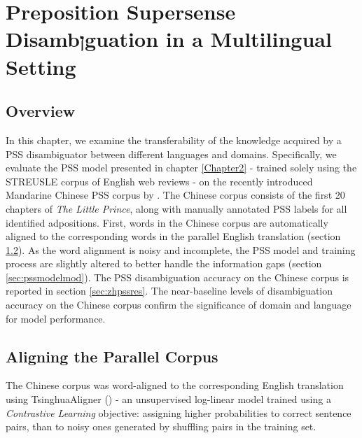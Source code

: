 
\chapter{Preposition Supersense Disambןguation in a Multilingual Setting } %

\label{Chapter4} %

\section{Overview}

In this chapter, we examine the transferability of the knowledge acquired by a PSS disambiguator between different languages and domains. Specifically, we evaluate the PSS model presented in chapter \ref{Chapter2} - trained solely using the STREUSLE corpus of English web reviews - on the recently introduced Mandarine Chinese PSS corpus by \cite{chinesecorpus}. The Chinese corpus consists of the first 20 chapters of \textit{The Little Prince}, along with manually annotated PSS labels for all identified adpositions. First, words in the Chinese corpus are automatically aligned to the corresponding words in the parallel English translation (section \ref{sec:chinesecorpus}). As the word alignment is noisy and incomplete, the PSS model and training process are slightly altered to better handle the information gaps (section \ref{sec:pssmodelmod}). The PSS disambiguation accuracy on the Chinese corpus is reported in section \ref{sec:zhpssres}. The near-baseline levels of disambiguation accuracy on the Chinese corpus confirm the significance of domain and language for model performance.

\section{Aligning the Parallel Corpus} \label{sec:chinesecorpus}

The Chinese corpus was word-aligned to the corresponding English translation using TsinghuaAligner (\cite{liu2014contrastive}) - an unsupervised log-linear model trained using a \textit{Contrastive Learning} objective: assigning higher probabilities to correct sentence pairs, than to noisy ones generated by shuffling pairs in the training set. 

